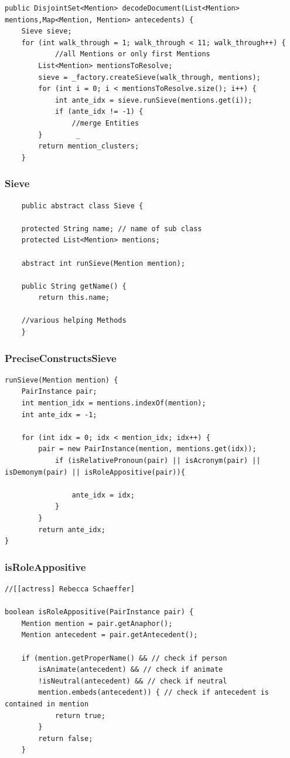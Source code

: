 \documentclass[11pt,a4paper]{beamer}
\begin{document}
\begin{frame}[fragile]
\begin{lstlisting}
public DisjointSet<Mention> decodeDocument(List<Mention> mentions,Map<Mention, Mention> antecedents) {   		
    Sieve sieve;        
    for (int walk_through = 1; walk_through < 11; walk_through++) {       	
        	//all Mentions or only first Mentions  
        List<Mention> mentionsToResolve;  
        sieve = _factory.createSieve(walk_through, mentions);
        for (int i = 0; i < mentionsToResolve.size(); i++) {		    	
            int ante_idx = sieve.runSieve(mentions.get(i));
            if (ante_idx != -1) {
                //merge Entities
        }        _
	    return mention_clusters;
	}
\end{lstlisting}

\end{frame}

\begin{frame}[fragile]
\frametitle{Sieve}
\begin{lstlisting}
	public abstract class Sieve {

	protected String name; // name of sub class	
	protected List<Mention> mentions;
	 
	abstract int runSieve(Mention mention);
	
	public String getName() {
	    return this.name;
		
	//various helping Methods
	}
\end{lstlisting}
\end{frame}

\begin{frame}[fragile]
\frametitle{PreciseConstructsSieve}
\begin{lstlisting}
runSieve(Mention mention) {
	PairInstance pair;
	int mention_idx = mentions.indexOf(mention);
	int ante_idx = -1;
		
	for (int idx = 0; idx < mention_idx; idx++) {			
	    pair = new PairInstance(mention, mentions.get(idx));
	        if (isRelativePronoun(pair) || isAcronym(pair) || isDemonym(pair) || isRoleAppositive(pair)){ 	            
	            
	            ante_idx = idx;
			}
		}
		return ante_idx;
}
\end{lstlisting}
\end{frame}

\begin{frame}[fragile]
\frametitle{isRoleAppositive}
\begin{lstlisting}
//[[actress] Rebecca Schaeffer]

boolean isRoleAppositive(PairInstance pair) {
    Mention mention = pair.getAnaphor();
    Mention antecedent = pair.getAntecedent();
    
    if (mention.getProperName() && // check if person
        isAnimate(antecedent) && // check if animate
        !isNeutral(antecedent) && // check if neutral
        mention.embeds(antecedent)) { // check if antecedent is contained in mention							
            return true;
		}
		return false;
	}
\end{lstlisting}
\end{frame}
\end{document}
